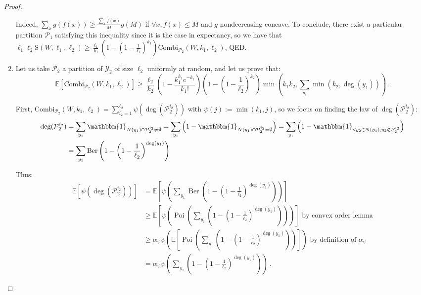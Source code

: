 \documentclass[11pt]{article}
\theoremstyle{definition}
\theoremstyle{remark}
\DeclareMathOperator{\Poi}{\text{Poi}}
\DeclareMathOperator{\Ber}{\text{Ber}}
\begin{document}
\begin{proof}
\begin{enumerate}
Indeed, $\sum_x g(f(x)) \geq \frac{\sum_{x}{f(x)}}{M}g(M)$ if $\forall x, f(x) \leq M$ and $g$ nondecreasing concave. To conclude, there exist a particular partition $\mathcal{P}_1$ satisfying this inequality since it is the case in expectancy, so we have that $\ell_1\ell_2\mathrm{S}(W,\ell_1,\ell_2) \geq \frac{\ell_1}{k_1}\left(1-\left(1-\frac{1}{\ell_1}\right)^{k_1}\right)\textrm{Combi}_{\mathcal{P}_2}(W,k_1,\ell_2)$, QED.
  
\item Let us take $\mathcal{P}_2$ a partition of $\mathcal{Y}_2$ of size $\ell_2$ uniformly at random, and let us prove that:
  \[ \mathbb{E}\left[\textrm{Combi}_{\mathcal{P}_2}(W,k_1,\ell_2)\right] \geq \frac{\ell_2}{k_2}\left(1 - \frac{k_1^{k_1}e^{-k_1}}{k_1!}\right)\left(1-\left(1-\frac{1}{\ell_2}\right)^{k_2}\right)\min\left(k_1k_2,\sum_{y_1}\min(k_2,\deg(y_1))\right) \ . \]

  First, $\textrm{Combi}_{\mathcal{P}_2}(W,k_1,\ell_2) = \sum_{i_2=1}^{\ell_2}\psi(\deg(\mathcal{P}_2^{i_2}))$ with $\psi(j):=\min(k_1,j)$, so we focus on finding the law of $\deg(\mathcal{P}_2^{i_2})$:
  \begin{equation}
    \begin{aligned}
      \deg(\mathcal{P}_2^{i_2}) &= \sum_{y_1} \mathbbm{1}_{N(y_1) \cap \mathcal{P}_2^{i_2} \not= \emptyset} = \sum_{y_1} \left(1-\mathbbm{1}_{N(y_1) \cap \mathcal{P}_2^{i_2} = \emptyset}\right) = \sum_{y_1} \left(1-\mathbbm{1}_{\forall y_2 \in N(y_1), y_2 \not\in \mathcal{P}_2^{i_2}}\right)\\
      &= \sum_{y_1} \Ber\left(1-\left(1-\frac{1}{\ell_2}\right)^{\deg(y_1)}\right)
    \end{aligned}
  \end{equation}

Thus:
\begin{equation}
  \begin{aligned}
    \mathbb{E}\left[\psi( \deg(\mathcal{P}_2^{i_2}))\right] &= \mathbb{E}\left[\psi\left(\sum_{y_1}\Ber\left(1-\left(1-\frac{1}{\ell_2}\right)^{\deg(y_1)}\right)\right)\right]\\
    &\geq  \mathbb{E}\left[\psi\left(\Poi\left(\sum_{y_1}\left(1-\left(1-\frac{1}{\ell_2}\right)^{\deg(y_1)}\right)\right)\right)\right] \text{ by convex order lemma}\\
    &\geq \alpha_{\psi}\psi\left(\mathbb{E}\left[\Poi\left(\sum_{y_1}\left(1-\left(1-\frac{1}{\ell_2}\right)^{\deg(y_1)}\right)\right)\right]\right)  \text{ by definition of $\alpha_{\psi}$}\\
    &= \alpha_{\psi}\psi\left(\sum_{y_1}\left(1-\left(1-\frac{1}{\ell_2}\right)^{\deg(y_1)}\right)\right)\ .
  \end{aligned}
\end{equation}


\end{enumerate}
\end{proof}
\end{document}
